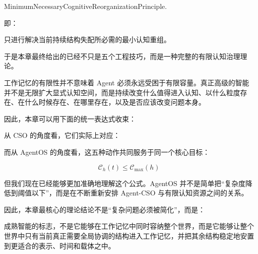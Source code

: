 \begin{statementbox}
MinimumNecessaryCognitiveReorganizationPrinciple.
\end{statementbox}

即：

\begin{statementbox}
只进行解决当前持续结构失配所必需的最小认知重组。
\end{statementbox}

于是本章最终给出的已经不只是五个工程技巧，而是一种完整的有限认知治理理论。

工作记忆的有限性并不意味着 Agent 必须永远受困于有限容量。真正高级的智能并不是无限扩大显式认知空间，而是持续改变什么值得进入认知、以什么粒度存在、在什么时候存在、在哪里存在，以及是否应该改变问题本身。

因此，本章可以用下面的统一表达式收束：

\begin{statementbox}
\centering
{}
\end{statementbox}

从 CSO 的角度看，它们实际上对应：

\begin{statementbox}
\centering
{}
\end{statementbox}

而从 AgentOS 的角度看，这五种动作共同服务于同一个核心目标：

\[
\boxed{
\mathcal C_h(t)
\leq
\mathcal C_{\max}(h)
}
\]

但我们现在已经能够更加准确地理解这个公式。AgentOS 并不是简单把“复杂度降低到阈值以下”，而是在不断重新安排 Agent-CSO 与有限认知资源之间的关系。

因此，本章最核心的理论结论不是“复杂问题必须被简化”，而是：

\begin{conclusion}
成熟智能的标志，不是它能够在工作记忆中同时容纳整个世界，而是它能够让整个世界中只有当前真正需要全局协调的结构进入工作记忆，并把其余结构稳定地安置到更适合的表示、时间和载体之中。
\end{conclusion}


